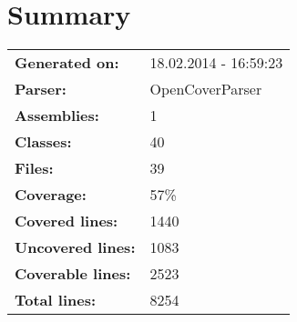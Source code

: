 \documentclass[a4paper,10pt]{article}
\begin{document}
\setcounter{secnumdepth}{-1}
\section{Summary}
\begin{longtable}[l]{ll}
\textbf{Generated on:} & 18.02.2014 - 16:59:23\\
\textbf{Parser:} & OpenCoverParser\\
\textbf{Assemblies:} & 1\\
\textbf{Classes:} & 40\\
\textbf{Files:} & 39\\
\textbf{Coverage:} & 57\%\\
\textbf{Covered lines:} & 1440\\
\textbf{Uncovered lines:} & 1083\\
\textbf{Coverable lines:} & 2523\\
\textbf{Total lines:} & 8254\\
\end{longtable}
\end{document}
